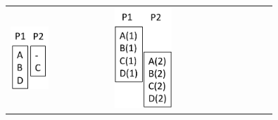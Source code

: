 \begin{figure}[tbhp]
\small
\begin{tabular}{lll}


\begin{minipage}[b]{4.20cm}
\centering
\includegraphics[width=0.4\textwidth]{images/HPCloop.pdf}
\end{minipage}

&

\begin{minipage}[b]{4.20cm}
\centering
\includegraphics[width=0.4\textwidth]{images/HPCdoacrossLoop.pdf}
\end{minipage}

&


\end{tabular}
\end{figure}
